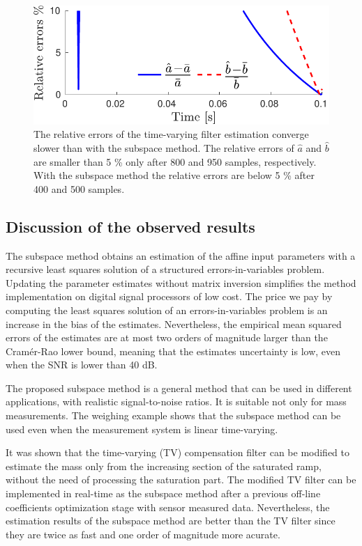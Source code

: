 \begin{figure}[!htbp]
\centering
\includegraphics[width=1\columnwidth]{./ChapterRampInput/fig/Fig_9.pdf} 
\caption{ \label{fig:rele_tv_40dB_s1} The relative errors of the time-varying filter estimation converge slower than with the subspace method. 
The relative errors of $\widehat{a}$ and $\widehat{b}$ are smaller than 5 \% only after 800 and 950 samples, respectively.
With the subspace method the relative errors are below 5 \% after 400 and 500 samples. }
\end{figure}



\subsection{Discussion of the observed results}

The subspace method obtains an estimation of the affine input parameters with a recursive least squares solution of a structured errors-in-variables problem.
Updating the parameter estimates without matrix inversion simplifies the method implementation on digital signal processors of low cost.
The price we pay by computing the least squares solution of an errors-in-variables problem is an increase in the bias of the estimates.
Nevertheless, the empirical mean squared errors of the estimates are at most two orders of magnitude larger than the Cram\'er-Rao lower bound, meaning that the estimates uncertainty is low, even when the SNR is lower than 40 dB.


The proposed subspace method is a general method that can be used in different applications, with realistic signal-to-noise ratios. 
It is suitable not only for mass measurements.
The weighing example shows that the subspace method can be used even when the measurement system is linear time-varying.

It was shown that the time-varying (TV) compensation filter can be modified to estimate the mass only from the increasing section of the saturated ramp, without the need of processing the saturation part.
The modified TV filter can be implemented in real-time as the subspace method after a previous off-line coefficients optimization stage with sensor measured data.
Nevertheless, the estimation results of the subspace method are better than the TV filter since they are twice as fast and one order of magnitude more acurate.

